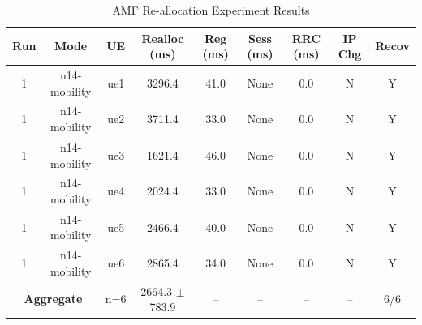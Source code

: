 \begin{table}[ht]
\centering
\begin{tabular}{|c|c|c|c|c|c|c|c|c|}
\hline
Run & Mode & UE & Realloc (ms) & Reg (ms) & Sess (ms) & RRC (ms) & IP Chg & Recov \\
\hline
1 & n14-mobility & ue1 & 3296.4 & 41.0 & None & 0.0 & N & Y \\
1 & n14-mobility & ue2 & 3711.4 & 33.0 & None & 0.0 & N & Y \\
1 & n14-mobility & ue3 & 1621.4 & 46.0 & None & 0.0 & N & Y \\
1 & n14-mobility & ue4 & 2024.4 & 33.0 & None & 0.0 & N & Y \\
1 & n14-mobility & ue5 & 2466.4 & 40.0 & None & 0.0 & N & Y \\
1 & n14-mobility & ue6 & 2865.4 & 34.0 & None & 0.0 & N & Y \\
\multicolumn{2}{|c|}{\textbf{Aggregate}} & n=6 & 2664.3 $\pm$ 783.9 & -- & -- & -- & -- & 6/6 \\
\hline
\end{tabular}
\caption{AMF Re-allocation Experiment Results}
\label{tab:amf_realloc}
\end{table}
